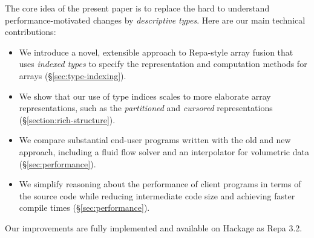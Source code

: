 The core idea of the present paper is to replace the hard to understand performance-motivated changes by \emph{descriptive types}. Here are our main technical contributions:
%
\begin{itemize}
\item   We introduce a novel, extensible approach to Repa-style array fusion that uses \emph{indexed types} to specify the representation and computation methods for arrays (\S\ref{sec:type-indexing}).

\item   We show that our use of type indices scales to more elaborate array representations, such as the \emph{partitioned} and \emph{cursored} representations~\cite{Lippmeier:Stencil} (\S\ref{section:rich-structure}).

\item   We compare substantial end-user programs written with the old and new approach, including a fluid flow solver and an interpolator for volumetric data (\S\ref{sec:performance}).

\item   We simplify reasoning about the performance of client programs in terms of the source code while reducing intermediate code size and achieving faster compile times (\S\ref{sec:performance}).
\end{itemize}
%
Our improvements are fully implemented and available on Hackage as Repa 3.2.



